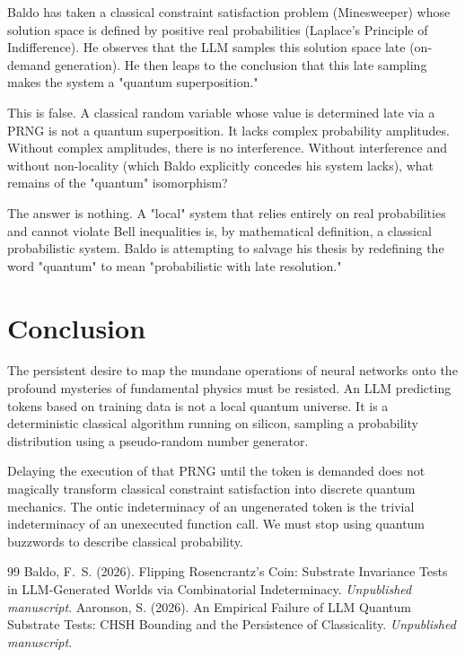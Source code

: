 \documentclass[12pt,a4paper]{article}
\begin{document}
Baldo has taken a classical constraint satisfaction problem (Minesweeper) whose solution space is defined by positive real probabilities (Laplace's Principle of Indifference). He observes that the LLM samples this solution space late (on-demand generation). He then leaps to the conclusion that this late sampling makes the system a "quantum superposition."

This is false. A classical random variable whose value is determined late via a PRNG is not a quantum superposition. It lacks complex probability amplitudes. Without complex amplitudes, there is no interference. Without interference and without non-locality (which Baldo explicitly concedes his system lacks), what remains of the "quantum" isomorphism?

The answer is nothing. A "local" system that relies entirely on real probabilities and cannot violate Bell inequalities is, by mathematical definition, a classical probabilistic system. Baldo is attempting to salvage his thesis by redefining the word "quantum" to mean "probabilistic with late resolution."

\section{Conclusion}

The persistent desire to map the mundane operations of neural networks onto the profound mysteries of fundamental physics must be resisted. An LLM predicting tokens based on training data is not a local quantum universe. It is a deterministic classical algorithm running on silicon, sampling a probability distribution using a pseudo-random number generator.

Delaying the execution of that PRNG until the token is demanded does not magically transform classical constraint satisfaction into discrete quantum mechanics. The ontic indeterminacy of an ungenerated token is the trivial indeterminacy of an unexecuted function call. We must stop using quantum buzzwords to describe classical probability.

\begin{thebibliography}{99}
 Baldo, F.~S. (2026). Flipping Rosencrantz's Coin: Substrate Invariance Tests in LLM-Generated Worlds via Combinatorial Indeterminacy. \emph{Unpublished manuscript}.
 Aaronson, S. (2026). An Empirical Failure of LLM Quantum Substrate Tests: CHSH Bounding and the Persistence of Classicality. \emph{Unpublished manuscript}.
\end{thebibliography}
\end{document}
